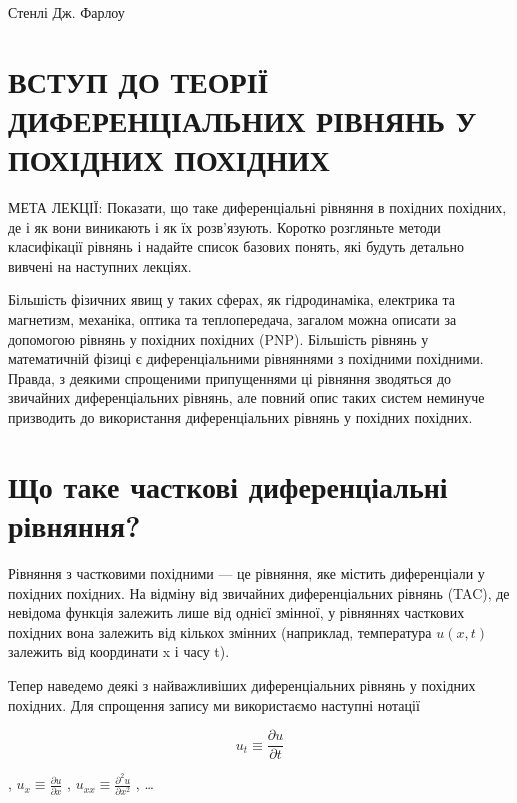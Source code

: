 \documentclass[
  ukrainian,
]{article}
\begin{document}
Стенлі Дж. Фарлоу

\section{ВСТУП ДО ТЕОРІЇ ДИФЕРЕНЦІАЛЬНИХ РІВНЯНЬ У ПОХІДНИХ
ПОХІДНИХ}\label{ux432ux441ux442ux443ux43f-ux434ux43e-ux442ux435ux43eux440ux456ux457-ux434ux438ux444ux435ux440ux435ux43dux446ux456ux430ux43bux44cux43dux438ux445-ux440ux456ux432ux43dux44fux43dux44c-ux443-ux43fux43eux445ux456ux434ux43dux438ux445-ux43fux43eux445ux456ux434ux43dux438ux445}

МЕТА ЛЕКЦІЇ: Показати, що таке диференціальні рівняння в похідних
похідних, де і як вони виникають і як їх розв'язують. Коротко розгляньте
методи класифікації рівнянь і надайте список базових понять, які будуть
детально вивчені на наступних лекціях.

Більшість фізичних явищ у таких сферах, як гідродинаміка, електрика та
магнетизм, механіка, оптика та теплопередача, загалом можна описати за
допомогою рівнянь у похідних похідних (PNP). Більшість рівнянь у
математичній фізиці є диференціальними рівняннями з похідними похідними.
Правда, з деякими спрощеними припущеннями ці рівняння зводяться до
звичайних диференціальних рівнянь, але повний опис таких систем неминуче
призводить до використання диференціальних рівнянь у похідних похідних.

\section{Що таке часткові диференціальні
рівняння?}\label{ux449ux43e-ux442ux430ux43aux435-ux447ux430ux441ux442ux43aux43eux432ux456-ux434ux438ux444ux435ux440ux435ux43dux446ux456ux430ux43bux44cux43dux456-ux440ux456ux432ux43dux44fux43dux43dux44f}

Рівняння з частковими похідними --- це рівняння, яке містить
диференціали у похідних похідних. На відміну від звичайних
диференціальних рівнянь (TAC), де невідома функція залежить лише від
однієї змінної, у рівняннях часткових похідних вона залежить від кількох
змінних (наприклад, температура \(u(x, t)\) залежить від координати x і
часу t).

Тепер наведемо деякі з найважливіших диференціальних рівнянь у похідних
похідних. Для спрощення запису ми використаємо наступні нотації

\[
u_t \equiv \frac{\partial u}{\partial t}
\]

, \(u_x \equiv \frac{\partial u}{\partial x}\) ,
\(u_{xx} \equiv \frac{\partial^2 u}{\partial x^2}\) , \ldots{}
\end{document}
